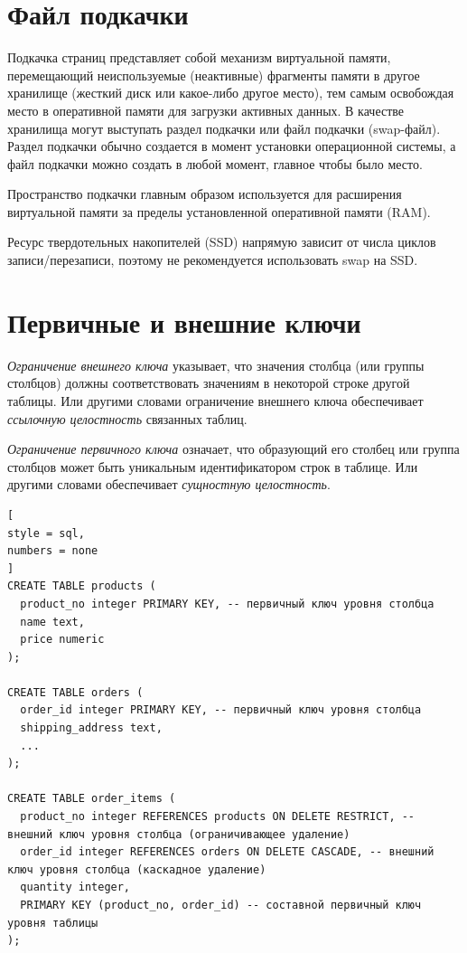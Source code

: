 \documentclass[%
	11pt,
	a4paper,
	utf8,
		]{article}
\begin{document}
\section{Файл подкачки}

Подкачка страниц представляет собой механизм виртуальной памяти, перемещающий неиспользуемые (неактивные) фрагменты памяти в другое хранилище (жесткий диск или какое-либо другое место), тем самым освобождая место в оперативной памяти для загрузки активных данных. В качестве хранилища могут выступать раздел подкачки или файл подкачки (swap-файл). Раздел подкачки обычно создается в момент установки операционной системы, а файл подкачки можно создать в любой момент, главное чтобы было место.

Пространство подкачки главным образом используется для расширения виртуальной памяти за пределы установленной оперативной памяти (RAM).

Ресурс твердотельных накопителей (SSD) напрямую зависит от числа циклов записи/перезаписи, поэтому не рекомендуется использовать swap на SSD.

\section{Первичные и внешние ключи}

\emph{Ограничение внешнего ключа} указывает, что значения столбца (или группы столбцов) должны соответствовать значениям в некоторой строке другой таблицы. Или другими словами ограничение внешнего ключа обеспечивает \emph{ссылочную целостность} связанных таблиц.

\emph{Ограничение первичного ключа} означает, что образующий его столбец или группа столбцов может быть уникальным идентификатором строк в таблице. Или другими словами обеспечивает \emph{сущностную целостность}.

\begin{lstlisting}[
style = sql,
numbers = none	
]
CREATE TABLE products (
  product_no integer PRIMARY KEY, -- первичный ключ уровня столбца
  name text,
  price numeric
);

CREATE TABLE orders (
  order_id integer PRIMARY KEY, -- первичный ключ уровня столбца
  shipping_address text,
  ...
);

CREATE TABLE order_items (
  product_no integer REFERENCES products ON DELETE RESTRICT, -- внешний ключ уровня столбца (ограничивающее удаление)
  order_id integer REFERENCES orders ON DELETE CASCADE, -- внешний ключ уровня столбца (каскадное удаление)
  quantity integer,
  PRIMARY KEY (product_no, order_id) -- составной первичный ключ уровня таблицы
);
\end{lstlisting}
\end{document}
